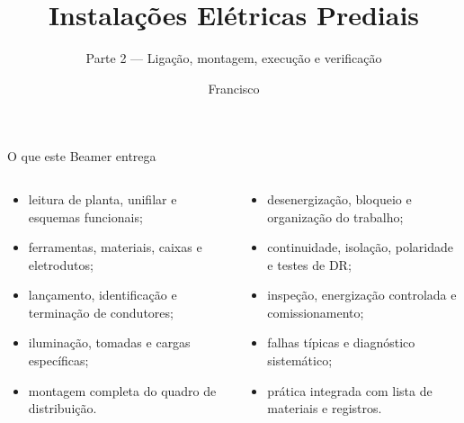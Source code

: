 \documentclass[11pt,aspectratio=169]{beamer}
\title{Instalações Elétricas Prediais}
\subtitle{Parte 2 — Ligação, montagem, execução e verificação}
\author{Francisco}
\institute{Do esquema elétrico à instalação verificada}
\date{}
\begin{document}
{
\begin{frame}\titlepage\end{frame}}

\begin{frame}{O que este Beamer entrega}
\small
\begin{columns}[T,onlytextwidth]
\begin{caixaProjeto}[title=Ligação e montagem]
\begin{itemize}
\item leitura de planta, unifilar e esquemas funcionais;
\item ferramentas, materiais, caixas e eletrodutos;
\item lançamento, identificação e terminação de condutores;
\item iluminação, tomadas e cargas específicas;
\item montagem completa do quadro de distribuição.
\end{itemize}
\end{caixaProjeto}
\begin{caixaNorma}[title=Segurança e entrega]
\begin{itemize}
\item desenergização, bloqueio e organização do trabalho;
\item continuidade, isolação, polaridade e testes de DR;
\item inspeção, energização controlada e comissionamento;
\item falhas típicas e diagnóstico sistemático;
\item prática integrada com lista de materiais e registros.
\end{itemize}
\end{caixaNorma}
\end{columns}
\end{frame}


















\end{document}
